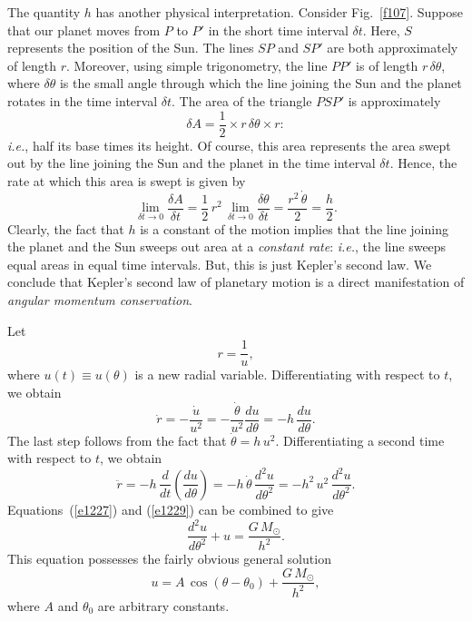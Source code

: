 The quantity $h$ has another physical interpretation. Consider Fig.~\ref{f107}. Suppose that
our planet moves from $P$ to $P'$ in the short time interval $\delta t$. Here, $S$ represents
the position of the Sun. The lines $SP$ and $SP'$ are both approximately of length $r$. 
Moreover, using simple trigonometry, the line $PP'$ is of length $r\,\delta\theta$, where
$\delta\theta$ is the small angle through which the line joining the Sun and the planet 
rotates in the time interval $\delta t$. The area of the triangle $PSP'$ is approximately
\begin{equation}
\delta A = \frac{1}{2}\times r\,\delta\theta \times r:
\end{equation}
{\em i.e.}, half its base times its height. Of course, this area represents the area swept out
by the line joining the Sun and the planet in the  time interval $\delta t$. Hence, the
rate at which this area is swept is given by
\begin{equation}\label{sweep}
\lim_{\delta t\rightarrow 0}\frac{\delta A}{\delta t} = \frac{1}{2}\,r^2\,\lim_{\delta t\rightarrow 0}\frac{\delta \theta}{\delta t}
= \frac{r^2\,\dot{\theta}}{2} = \frac{h}{2}.
\end{equation}
Clearly, the fact that $h$ is a constant of the motion implies that the line joining the planet and
the Sun sweeps out area at a {\em  constant rate}: {\em i.e.}, the line sweeps equal areas in equal time intervals.
But, this is just Kepler's second law. We conclude that Kepler's second law of planetary motion is  a direct  manifestation of
{\em angular momentum conservation}.

Let
\begin{equation}
r = \frac{1}{u},
\end{equation}
where $u(t)\equiv u(\theta)$ is a new radial variable. Differentiating with respect to $t$, we obtain
\begin{equation}\label{e1228}
\dot{r} =- \frac{\dot{u}}{u^2} = - \frac{\dot{\theta}}{u^2}\frac{du}{d\theta} =- h\,\frac{du}{d\theta}.
\end{equation}
The last step follows from the fact that $\dot{\theta} = h\,u^2$. Differentiating a second time
with respect to $t$, we obtain
\begin{equation}\label{e1229}
\ddot{r} =- h\,\frac{d}{dt}\!\left(\frac{du}{d\theta}\right)= - h\,\dot{\theta}\,\frac{d^2 u}{d \theta^2}
= - h^2\,u^2\,\frac{d^2 u}{d\theta^2}.
\end{equation}
Equations~(\ref{e1227}) and (\ref{e1229}) can be combined to give
\begin{equation}
\frac{d^2 u}{d\theta^2} + u = \frac{G\,M_\odot}{h^2}.
\end{equation}
This equation possesses the fairly obvious general solution
\begin{equation}
u = A\,\cos(\theta-\theta_0) + \frac{G\,M_\odot}{h^2},
\end{equation}
where $A$ and $\theta_0$ are arbitrary constants.

